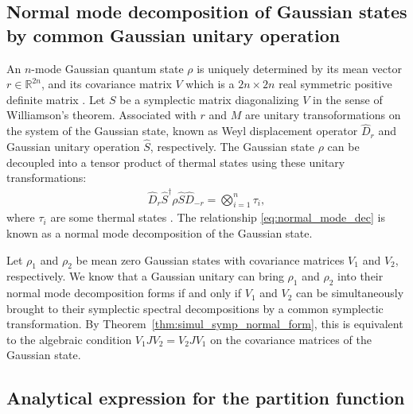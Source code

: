 \documentclass[preprint,12pt]{elsarticle}
\begin{document}
\subsection{Normal mode decomposition of Gaussian states by common Gaussian unitary operation}
    An $n$-mode Gaussian quantum state $\rho$ is uniquely determined by its mean vector $r \in \mathds{R}^{2n}$, and its covariance matrix $V$ which is a $2n \times 2n$ real symmetric positive definite matrix \cite{serafini2017quantum}.
    Let $S$ be a symplectic matrix diagonalizing $V$ in the sense of Williamson's theorem.
    Associated with $r$ and $M$ are unitary transoformations on the system of the Gaussian state, known as Weyl displacement operator $\hat{D}_r$ and Gaussian unitary operation $\hat{S}$, respectively. 
    The Gaussian state $\rho$ can be decoupled into a tensor product of thermal states using these unitary transformations:
    \begin{align}\label{eq:normal_mode_dec}
        \hat{D}_{r} \hat{S}^{\dagger} \rho \hat{S} \hat{D}_{-r} = \bigotimes_{i=1}^n \tau_i,
    \end{align}
    where $\tau_i$ are some thermal states \cite[Eq.~3.38]{serafini2017quantum}.
    The relationship \eqref{eq:normal_mode_dec} is known as a normal mode decomposition of the Gaussian state.

   
    Let $\rho_1$ and $\rho_2$ be mean zero Gaussian states with covariance matrices $V_1$ and $V_2$, respectively.
    We know that a Gaussian unitary can bring $\rho_1$ and $\rho_2$ into their normal mode decomposition forms if and only if $V_1$ and $V_2$ can be simultaneously brought to their symplectic spectral decompositions by a common symplectic transformation.
    By Theorem~\ref{thm:simul_symp_normal_form}, this is equivalent to the algebraic condition $V_1 J V_2 = V_2 J V_1$ on the covariance matrices of the Gaussian state.

\subsection{Analytical expression for the partition function}
\end{document}
